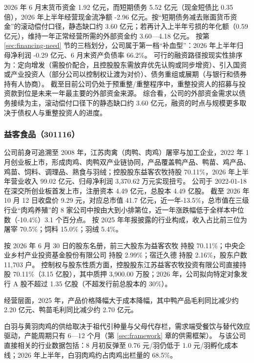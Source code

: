  2026 年 6 月末货币资金 1.92 亿元，而短期债务 5.52 亿元（现金短债比 0.35 倍），2026 年上半年经营现金流净额 -2.96 亿元。按“短期债务减去账面货币资金”的滚动偿付口径，静态缺口约 3.60 亿元；若再计入上半年亏损的年化额（0.59 亿元），维持一年正常经营所需的外部资金约 3.60---4.18 亿元。 按第 \ref{sec:financing-need} 节的三档划分，公司属于第一档“补血型”：2026 年上半年归母净利润 -0.29 亿元、6 月末资产负债率 66.2\%。 可行的融资路径按现实性排序为：定向增发（需股价配合，且控股股东需放弃优先认购或同步增资）、引入国资或产业投资人（部分公司以控制权让渡为对价）、债务重组或展期（与银行和债券持有人协商）。 截至目前公司仍处于预重整/重整程序中，重整投资人的招募与投资款到位是未来一年最主要的外部资金来源。 综合看，公司的外部资金需求以债务接续为主，滚动偿付口径下的静态缺口约 3.60 亿元，融资的时点与规模更多取决于债权人与重整投资人的进度。




\subsubsection{益客食品（301116）}
\label{co:301116}

 公司前身可追溯至 2008 年，江苏肉禽（肉鸭、肉鸡）屠宰与加工企业，2022 年 1 月创业板上市，形成肉鸡、肉鸭双产业链协同，产品覆盖鸭产品、鸭苗、鸡产品、鸡苗、饲料、调理品、熟食与羽绒；控股股东益客农牧持股 70.11\%，2026 年上半年营业收入 99.02 亿元、归母净利润 3,370.62 万元实现扭亏。 公司于 2022-01-18 在深交所创业板首发上市，注册资本 4.49 亿元，总股本 4.49 亿股。 截至 2026 年 10 月 12 日收盘价 9.29 元，对应总市值 41.7 亿元，近一年-13.5\%，总市值在三级行业“肉鸡养殖”的 8 家公司中按由大到小排第位，近一年涨跌幅低于全样本中位数（-10.4\%）3.1 个百分点。 按 2025 年年报披露的行业构成，收入占比前三位为屠宰 70.5\%；饲料 15.0\%；羽绒 5.4\%。

 按 2026 年 6 月 30 日的股东名册，前三大股东为益客农牧 持股 70.11\%；中央企业乡村产业投资基金股份有限公司 持股 2.99\%；宿迁久德 持股 2.16\%，股东户数 11,703 户。 控制权与股东性质方面，控股股东江苏益客农牧投资有限公司直接持股 70.11\%（3.15 亿股），其中质押 3,900.00 万股；2026 年，公司拟向特定对象发行 A 股不超过 1.35 亿股（不超发行前总股本的 30\%）。

 经营层面，2025 年，产品价格降幅大于成本降幅，其中鸭产品毛利同比减少约 2.20 亿元、鸭苗毛利同比减少约 2.70 亿元。

 白羽与黄羽肉鸡的供给取决于祖代引种量与父母代存栏，需求端受餐饮与替代效应驱动，产能周期只有 6---12 个月（第 \ref{sec:framework} 章的供需框架）。 与该公司直接相关的行业数据包括：8 月初反弹至 0.76 元/羽仍低于 1.0 元/羽孵化成本线；2026 年上半年，白羽肉鸡约占肉鸡出栏量的 68.5\%。

